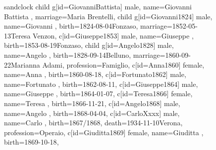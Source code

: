 \documentclass{article}
\begin{document}
\begin{figure}
\begin{minipage}[b]{0.19\textwidth}
\end{minipage}
\hfill
\begin{minipage}[b]{0.19\textwidth}
\centering

    \begin{genealogypicture}[
        processing=database,
        database format=full,
        node size=3.5cm,
        level size=2.8cm,
        level distance=6mm,
        list separators hang=3mm,
        name font=\bfseries,
        surn code={\textcolor{black!50!black}{#1}},
        place text={\newline}{},
        date format=d month yyyy,
        tcbset={male/.style={colframe=blue,colback=blue!5},
        female/.style={colframe=red,colback=red!5}},
        box={fit basedim=7pt,boxsep=2pt,segmentation style=solid,
            halign=left,before upper=\parskip1pt,
            \gtrDBsex,
        },
    ]
    sandclock
    {
        child{
            g[id=GiovanniBattista] {
                male,
                name={Giovanni Battista },
                marriage={Maria Brentelli}{},
            }
            child{
                g[id=Giovanni1824]{
                    male,
                    name={Giovanni },
                    birth={1824-08-04}{Fonzaso},
                    marriage={1852-05-13}{Teresa Venzon},
                }
                c[id=Giuseppe1853]{
                    male,
                    name={Giuseppe },
                    birth={1853-08-19}{Fonzaso},
                }
            }
            child{
                g[id=Angelo1828] {
                    male,
                    name={Angelo },
                    birth={1828-09-14}{Belluno},
                    marriage={1860-09-22}{Marianna Adami},
                    profession={Famiglio},
                }
                c[id=Anna1860]{
                    female,
                    name={Anna },
                    birth={1860-08-18}{},
                }
                c[id=Fortunato1862]{
                    male,
                    name={Fortunato },
                    birth={1862-08-11}{},
                }
                c[id=Giuseppe1864]{
                    male,
                    name={Giuseppe },
                    birth={1864-01-07}{},
                }
                c[id=Teresa1866]{
                    female,
                    name={Teresa },
                    birth={1866-11-21}{},
                }
                c[id=Angelo1868]{
                    male,
                    name={Angelo },
                    birth={1868-04-04}{},
                }
                c[id=CarloXxxx]{
                    male,
                    name={Carlo },
                    birth={1867/1868}{},
                    death={1934-11-10}{Verona},
                    profession={Operaio},
                }
                c[id=Giuditta1869]{
                    female,
                    name={Giuditta },
                    birth={1869-10-18}{},
                }
            }
        }
    }
    \end{genealogypicture}


\end{minipage}
\end{figure}
\end{document}
